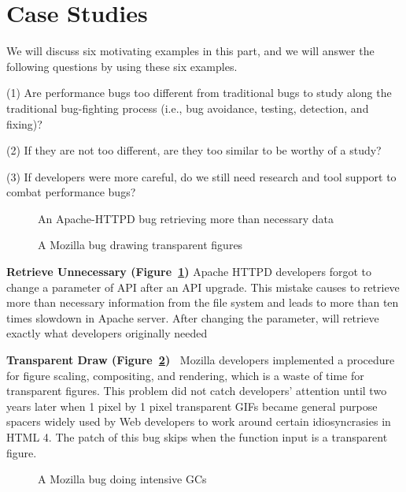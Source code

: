 \section{Case Studies}
\label{sec:3_case}
We will discuss six motivating examples in this part, and 
we will answer the following questions by using these six examples. 

(1) Are performance bugs too different from traditional bugs to study along
the traditional bug-fighting process (i.e.,
bug avoidance, testing, detection, and fixing)?

(2) If they are not too different, are they too similar to be worthy of 
a study?

(3) If developers were more careful, do we still need research and tool 
support to combat performance bugs?


\begin{figure}
\caption{An Apache-HTTPD bug retrieving more than necessary data}
\label{fig:Apache45464}
\end{figure}

\begin{figure}
\caption{A Mozilla bug drawing transparent figures}
\label{fig:Mozilla66461}
\end{figure}

{\bf Retrieve Unnecessary (Figure~\ref{fig:Apache45464})}
Apache HTTPD developers forgot to change a parameter of API  after an API upgrade. 
This mistake causes  to retrieve more than necessary information 
from the file system and leads to more than ten times slowdown in Apache server. 
After changing the parameter,  will retrieve exactly what developers originally needed


{\bf Transparent Draw (Figure~\ref{fig:Mozilla66461})\ } 
Mozilla developers implemented a procedure  for
figure scaling, compositing, and rendering, which is 
a waste of time for transparent figures. This problem did not catch 
developers' attention until two years later when 1 pixel by 1 pixel 
transparent GIFs became general purpose spacers widely used by Web
developers to work around certain idiosyncrasies in HTML 4.
The patch of this bug skips
 when the function input is a transparent figure.

\begin{figure}
\caption{A Mozilla bug doing intensive GCs}
\label{fig:Mozilla515287}
\end{figure}

